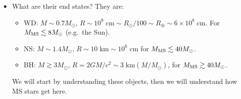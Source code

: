 \documentclass[11pt,
        usenames, %
        dvipsnames %
    ]{article}
\newcommand*{\scinot}[2]{#1\times10^{#2}}
\newcommand*{\p}[1]{\left(#1\right)}
\begin{document}
\begin{itemize}
    \item What are their end states? They are:
        \begin{itemize}
            \item WD\@: $M \sim 0.7 M_{\odot}$, $R \sim 10^9 \;\mathrm{cm} \sim
                R_{\odot} / 100 \sim R_{\oplus} \sim
                \scinot{6}{8}\;\mathrm{cm}$. For $M_{\rm MS} \lesssim
                8M_{\odot}$ (e.g.\ the Sun).

            \item NS\@: $M \sim 1.4M_{\odot}$, $R \sim 10\;\mathrm{km} \sim
                10^6\;\mathrm{cm}$ for $M_{\rm MS} \lesssim 40M_{\odot}$.

            \item BH\@: $M \gtrsim 3M_{\odot}$, $R = 2GM/c^2 \sim 3\;\mathrm{km}
                \p{M / M_{\odot}}$, for $M_{\rm MS} \gtrsim 40 M_{\odot}$.
        \end{itemize}
        We will start by understanding these objects, then we will understand
        how MS stars get here.
\end{itemize}
\end{document}
